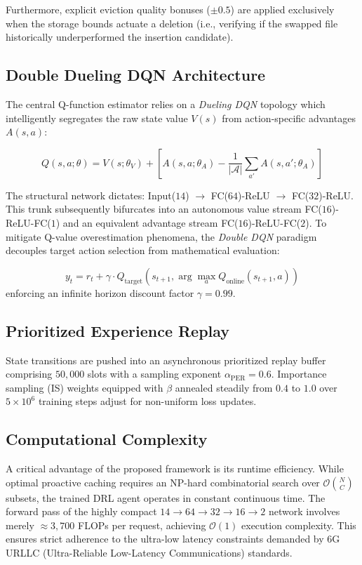 \documentclass[conference]{IEEEtran}
\begin{document}
Furthermore, explicit eviction quality bonuses ($\pm 0.5$) are applied exclusively when the storage bounds actuate a deletion (i.e., verifying if the swapped file historically underperformed the insertion candidate).

\subsection{Double Dueling DQN Architecture}
The central Q-function estimator relies on a \textit{Dueling DQN} topology \cite{b_wang_dueling} which intelligently segregates the raw state value $V(s)$ from action-specific advantages $A(s, a)$:

\begin{equation}
Q(s, a; \theta) = V(s; \theta_V) + \left[ A(s, a; \theta_A) - \frac{1}{|\mathcal{A}|}\sum_{a'} A(s, a'; \theta_A) \right]
\label{eq:dueling}
\end{equation}

The structural network dictates: Input($14$) $\rightarrow$ FC($64$)-ReLU $\rightarrow$ FC($32$)-ReLU. This trunk subsequently bifurcates into an autonomous value stream FC($16$)-ReLU-FC($1$) and an equivalent advantage stream FC($16$)-ReLU-FC($2$). To mitigate Q-value overestimation phenomena, the \textit{Double DQN} paradigm \cite{b_van_hasselt} decouples target action selection from mathematical evaluation:

\begin{equation}
y_t = r_t + \gamma \cdot Q_{\text{target}}\!\left(s_{t+1}, \arg\max_{a} Q_{\text{online}}(s_{t+1}, a)\right)
\label{eq:ddqn}
\end{equation}
enforcing an infinite horizon discount factor $\gamma = 0.99$.

\subsection{Prioritized Experience Replay}
State transitions are pushed into an asynchronous prioritized replay buffer \cite{b_schaul_per} comprising $50,000$ slots with a sampling exponent $\alpha_{\text{PER}} = 0.6$. Importance sampling (IS) weights equipped with $\beta$ annealed steadily from $0.4$ to $1.0$ over $5\times 10^6$ training steps adjust for non-uniform loss updates.

\subsection{Computational Complexity}
A critical advantage of the proposed framework is its runtime efficiency. While optimal proactive caching requires an NP-hard combinatorial search over $\mathcal{O}\binom{N}{C}$ subsets, the trained DRL agent operates in constant continuous time. The forward pass of the highly compact $14 \rightarrow 64 \rightarrow 32 \rightarrow 16 \rightarrow 2$ network involves merely $\approx 3,700$ FLOPs per request, achieving $\mathcal{O}(1)$ execution complexity. This ensures strict adherence to the ultra-low latency constraints demanded by 6G URLLC (Ultra-Reliable Low-Latency Communications) standards.
\end{document}
